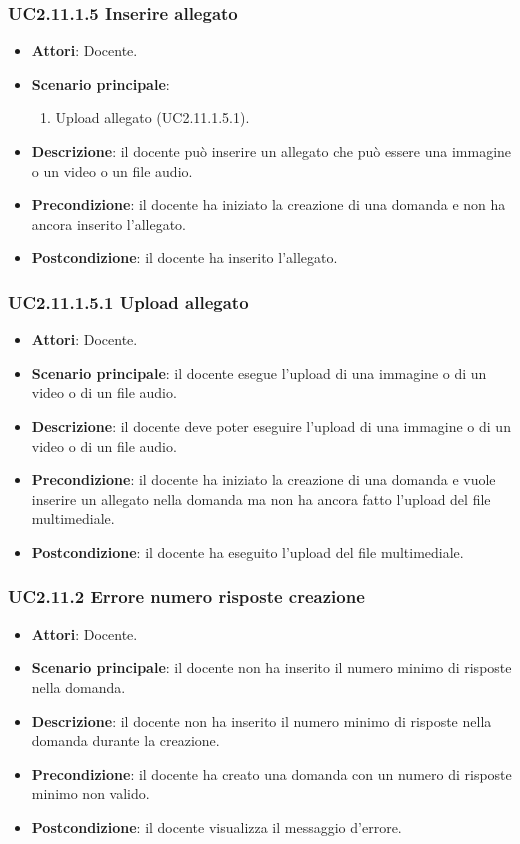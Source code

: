 \subsubsection{UC2.11.1.5 Inserire allegato}
\begin{itemize}
\item \textbf{Attori}: Docente.
\item \textbf{Scenario principale}:
\begin{enumerate}
\item Upload allegato (UC2.11.1.5.1).
\end{enumerate}
\item \textbf{Descrizione}: il docente può inserire un allegato che può essere una immagine o un video o un file audio.
\item \textbf{Precondizione}: il docente ha iniziato la creazione di una domanda e non ha ancora inserito l'allegato.
\item \textbf{Postcondizione}: il docente ha inserito l'allegato.
\end{itemize}
\subsubsection{UC2.11.1.5.1 Upload allegato}
\begin{itemize}
\item \textbf{Attori}: Docente.
\item \textbf{Scenario principale}: il docente esegue l'upload di una immagine o di un video o di un file audio.
\item \textbf{Descrizione}: il docente deve poter eseguire l'upload di una immagine o di un video o di un file audio.
\item \textbf{Precondizione}: il docente ha iniziato la creazione di una domanda e vuole inserire un allegato nella domanda ma non ha ancora fatto l'upload del file multimediale.
\item \textbf{Postcondizione}: il docente ha eseguito l'upload del file multimediale.
\end{itemize}
\subsubsection{UC2.11.2 Errore numero risposte creazione}
\begin{itemize}
\item \textbf{Attori}: Docente.
\item \textbf{Scenario principale}: il docente non ha inserito il numero minimo di risposte nella domanda.
\item \textbf{Descrizione}: il docente non ha inserito il numero minimo di risposte nella domanda durante la creazione.
\item \textbf{Precondizione}: il docente ha creato una domanda con un numero di risposte minimo non valido.
\item \textbf{Postcondizione}: il docente visualizza il messaggio d'errore.
\end{itemize}
